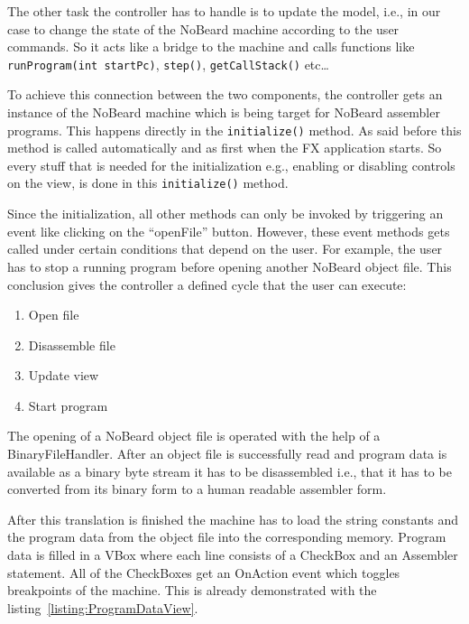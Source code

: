 The other task the controller has to handle is to update the model, i.e., in our case to change the state of the NoBeard machine according to the user commands. So it acts like a bridge to the machine and calls functions like \lstinline$runProgram(int startPc)$, \lstinline$step()$, \lstinline$getCallStack()$ etc\ldots

To achieve this connection between the two components, the controller gets an instance of the NoBeard machine which is being target for NoBeard assembler programs. This happens directly in the \lstinline$initialize()$ method. As said before this method is called automatically and as first when the FX application starts. So every stuff that is needed for the initialization e.g., enabling or disabling controls on the view, is done in this \lstinline$initialize()$ method.

Since the initialization, all other methods can only be invoked by triggering an event like clicking on the ``openFile'' button. However, these event methods gets called under certain conditions that depend on the user. For example, the user has to stop a running program before opening another NoBeard object file. This conclusion gives the controller a defined cycle that the user can execute:
\begin{enumerate}
\item Open file
\item Disassemble file
\item Update view
\item Start program
\end{enumerate}

The opening of a NoBeard object file is operated with the help of a BinaryFileHandler. After an object file is successfully read and program data is available as a binary byte stream it has to be disassembled i.e., that it has to be converted from its binary form to a human readable assembler form.

After this translation is finished the machine has to load the string constants and the program data from the object file into the corresponding memory. Program data is filled in a VBox where each line consists of a CheckBox and an Assembler statement. All of the CheckBoxes get an OnAction event which toggles breakpoints of the machine. This is already demonstrated with the listing~\ref{listing:ProgramDataView}.

